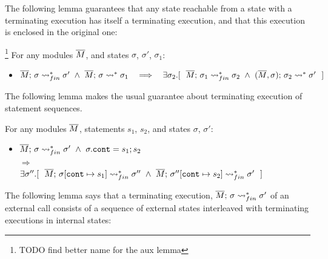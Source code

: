  The following lemma guarantees that any state reachable from a state with a terminating execution has itself a terminating execution, and that this execution is enclosed in the original one:
 
 \begin{auxLemma}\footnote{TODO find better name for the aux lemma}
 For any modules $\overline{M}$,   and states $\sigma$, $\sigma'$, $\sigma_1$:
\begin{itemize}
\item
$  \leadstoBoundedStarFin {\Mtwo}  {\sigma}  {\sigma'} \  \wedge \  \leadstoBoundedStar  {\Mtwo}  {\sigma}  {\sigma_1} 
\ \ \  \Longrightarrow\ \ \  %
 \exists \sigma_2.[\ \ \leadstoBoundedStarFin {\Mtwo} {\sigma_1}  {\sigma_2}  
\ \wedge\ 
\leadstoBoundedStarThree  {\Mtwo}  {\sigma_2}  {\sigma}   {\sigma'} \ \ ]$
\end{itemize}

\end{auxLemma} 
 
 The following lemma makes the usual guarantee about terminating execution of statement sequences.
  
\begin{auxLemma}
\label{lemma:subexp}
For any modules $\overline{M}$, statements $s_1$, $s_2$, and states $\sigma$, $\sigma'$:
\begin{itemize}
\item
$  \overline{M};\, {\sigma} \rightsquigarrow^*_{fin} \sigma' \   \wedge\  \sigma.\texttt{cont} = s_1; s_2$\\
$  \Longrightarrow$\\
$   \exists \sigma''.[\ \ \leadstoBoundedStarFin {\Mtwo} {\sigma[\texttt{cont}\mapsto s_1]}  {\sigma''}  
\ \wedge\ 
\leadstoBoundedStarFin {\Mtwo} {\sigma''[\texttt{cont}\mapsto s_2]}   {\sigma'} \ \ ]$
\end{itemize}
\end{auxLemma}
 

 The following lemma says that a terminating execution,  $ \overline{M};\, {\sigma} \rightsquigarrow^*_{fin} \sigma'$ of an external call   consists of a sequence of  external states interleaved with terminating executions in internal states:
 
